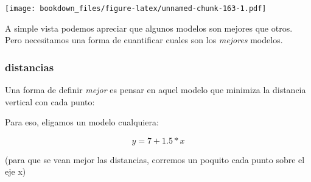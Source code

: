 \documentclass[]{book}
\newenvironment{Shaded}{\begin{snugshade}}{\end{snugshade}}
\newcommand{\DataTypeTok}[1]{\textcolor[rgb]{0.13,0.29,0.53}{#1}}
\newcommand{\DecValTok}[1]{\textcolor[rgb]{0.00,0.00,0.81}{#1}}
\newcommand{\FloatTok}[1]{\textcolor[rgb]{0.00,0.00,0.81}{#1}}
\newcommand{\KeywordTok}[1]{\textcolor[rgb]{0.13,0.29,0.53}{\textbf{#1}}}
\newcommand{\NormalTok}[1]{#1}
\newcommand{\OperatorTok}[1]{\textcolor[rgb]{0.81,0.36,0.00}{\textbf{#1}}}
\newcommand{\StringTok}[1]{\textcolor[rgb]{0.31,0.60,0.02}{#1}}
\begin{document}
\texttt{[image: bookdown\_files/figure-latex/unnamed-chunk-163-1.pdf]}

A simple vista podemos apreciar que algunos modelos son mejores que otros. Pero necesitamos una forma de cuantificar cuales son los \emph{mejores} modelos.

\hypertarget{distancias}{%
\subsubsection{distancias}\label{distancias}}

Una forma de definir \emph{mejor} es pensar en aquel modelo que minimiza la distancia vertical con cada punto:

Para eso, eligamos un modelo cualquiera:

\[ y= 7 + 1.5*x\]

(para que se vean mejor las distancias, corremos un poquito cada punto sobre el eje x)

\begin{Shaded}
\end{Shaded}
\end{document}
